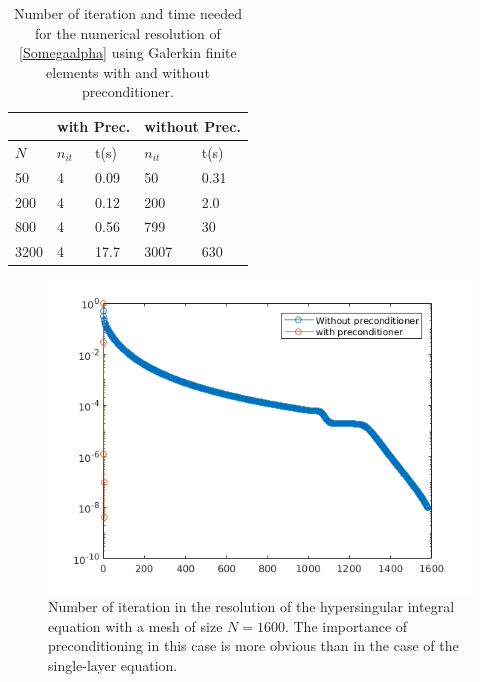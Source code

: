 \documentclass[a4paper]{article}
\begin{document}
\begin{table}[H]
	\begin{center}
		\begin{tabular}{|| m{4em} | m{4em} | m{4em} | m{4em} | m{4em}||} 
			\hline
			\multicolumn{1}{||c|}{ }&
			\multicolumn{2}{c|}{with Prec.}&\multicolumn{2}{c||}{without Prec.}\\
			\hline
			$N$ & $n_{it}$& t(s) & $n_{it}$ & t(s)\\
			\hline\hline
			50 & 4 & 0.09 & 50 & 0.31\\
			\hline
			200 & 4 & 0.12 & 200 & 2.0\\
			\hline
			800 & 4 & 0.56 & 799 & 30 \\
			\hline
			3200 & 4 & 17.7 & 3007 & 630\\
			\hline
		\end{tabular}
	\end{center}
	\caption{Number of iteration and time needed for the numerical resolution of \eqref{Somegaalpha} using Galerkin finite elements with and without preconditioner.}
	\label{TableNitTimeLaplaceNeumann}
\end{table}
\vspace{-0.7cm}
\begin{figure}[H]
	\centering
	\includegraphics[scale=0.5]{../../figs/PrecondNeumannLaplaceSeg.png}
	\caption{Number of iteration in the resolution of the hypersingular  integral equation with a mesh of size $N = 1600$. The importance of preconditioning in this case is more obvious than in the case of the single-layer equation.}
	\label{FigureNitLaplaceNeumann}
\end{figure}
\end{document}
